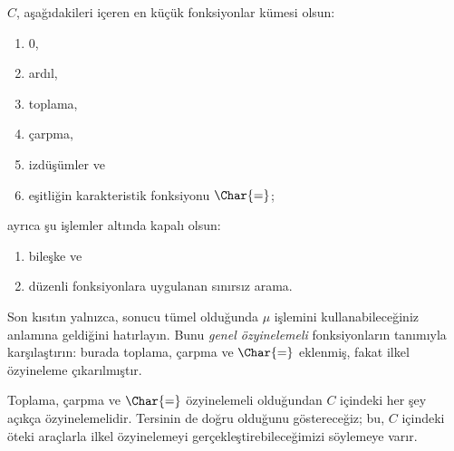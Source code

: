 \documentclass[../../../include/open-logic-section]{subfiles}
\begin{document}

$C$, aşağıdakileri içeren en küçük fonksiyonlar kümesi olsun:
\begin{enumerate}
\item $0$,
\item ardıl,
\item toplama,
\item çarpma,
\item izdüşümler ve
\item eşitliğin karakteristik fonksiyonu $\Char{=}$;
\end{enumerate}
ayrıca şu işlemler altında kapalı olsun:
\begin{enumerate}
\item bileşke ve
\item düzenli fonksiyonlara uygulanan sınırsız arama.
\end{enumerate}
Son kısıtın yalnızca, sonucu tümel olduğunda $\mu$ işlemini
kullanabileceğiniz anlamına geldiğini hatırlayın. Bunu \emph{genel
özyinelemeli} fonksiyonların tanımıyla karşılaştırın: burada toplama,
çarpma ve $\Char{=}$ eklenmiş, fakat ilkel özyineleme çıkarılmıştır.

Toplama, çarpma ve $\Char{=}$ özyinelemeli olduğundan $C$ içindeki her şey
açıkça özyinelemelidir. Tersinin de doğru olduğunu göstereceğiz; bu, $C$
içindeki öteki araçlarla ilkel özyinelemeyi gerçekleştirebileceğimizi
söylemeye varır.
\end{document}
